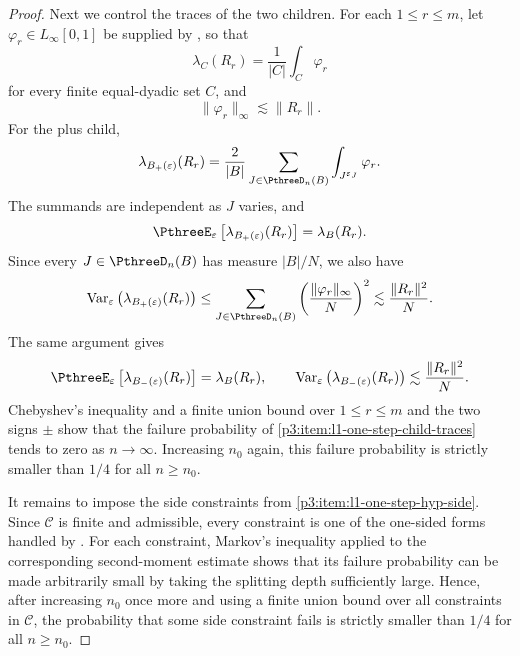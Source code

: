 \documentclass[11pt,reqno]{amsart}
\makeatletter
\theoremstyle{plain}
\theoremstyle{definition}
\newcounter{problempaper}
\newenvironment{problempaperbody}{%
  \setcounter{subsection}{0}%
  \setcounter{subsubsection}{0}%
  \setcounter{paragraph}{0}%
  \renewcommand{\thesubsection}{\arabic{subsection}}%
  \renewcommand{\thesubsubsection}{\thesubsection.\arabic{subsubsection}}%
  \renewcommand{\theparagraph}{\thesubsubsection.\arabic{paragraph}}%
  \let\problem@outersection\section
  \let\problem@outersubsection\subsection
  \let\problem@outersubsubsection\subsubsection
  \let\problem@outerparagraph\paragraph
  \let\section\problem@papersection
  \let\subsection\problem@papersubsection
  \let\subsubsection\problem@papersubsubsection
}{%
  \let\section\problem@outersection
  \let\subsection\problem@outersubsection
  \let\subsubsection\problem@outersubsubsection
  \let\paragraph\problem@outerparagraph
}
\newcommand{\problem@target}[2]{%
  \hypertarget{problem-\theproblempaper-#1-#2}{}%
}
\newcommand{\problem@paperheading}[3]{%
  \par\bigskip
  \problem@target{#1}{#2}%
  \noindent{\large\bfseries #2.\quad #3\par}%
  \nobreak\smallskip
}
\newcommand{\problem@papersubheading}[3]{%
  \par\medskip
  \problem@target{#1}{#2}%
  \noindent{\normalsize\bfseries #2.\quad #3\par}%
  \nobreak\smallskip
}
\newcommand{\problem@papersubsubheading}[3]{%
  \par\smallskip
  \problem@target{#1}{#2}%
  \noindent{\normalsize\itshape #2.\quad #3.\ }%
}
\def\problem@papersection{%
  \@ifstar{\problem@papersectionstar}{\problem@papersectionnostar}%
}
\def\problem@papersectionstar#1{%
  \par\bigskip\noindent{\large\bfseries #1\par}\nobreak\smallskip
}
\def\problem@papersectionnostar#1{%
  \refstepcounter{subsection}%
  \setcounter{subsubsection}{0}%
  \setcounter{paragraph}{0}%
  \problem@paperheading{section}{\thesubsection}{#1}%
  \problem@writecontentsline{section}{\thesubsection}{#1}%
}
\def\problem@papersubsection{%
  \@ifstar{\problem@papersubsectionstar}{\problem@papersubsectionnostar}%
}
\def\problem@papersubsectionstar#1{%
  \par\medskip\noindent{\normalsize\bfseries #1\par}\nobreak\smallskip
}
\def\problem@papersubsectionnostar#1{%
  \refstepcounter{subsubsection}%
  \setcounter{paragraph}{0}%
  \problem@papersubheading{subsection}{\thesubsubsection}{#1}%
  \problem@writecontentsline{subsection}{\thesubsubsection}{#1}%
}
\def\problem@papersubsubsection{%
  \@ifstar{\problem@papersubsubsectionstar}{\problem@papersubsubsectionnostar}%
}
\def\problem@papersubsubsectionstar#1{%
  \par\smallskip\noindent{\normalsize\itshape #1.\ }%
}
\def\problem@papersubsubsectionnostar#1{%
  \refstepcounter{paragraph}%
  \problem@papersubsubheading{subsubsection}{\theparagraph}{#1}%
  \problem@writecontentsline{subsubsection}{\theparagraph}{#1}%
}
\newcommand{\problem@writecontentsline}[3]{%
  \begingroup
  \protected@write\@auxout{}{%
    \string\problemcontentsentry{\theproblempaper}{#1}{#2}{#3}{\thepage}%
  }%
  \endgroup
}
\newcommand{\problemcontentsentry}[5]{%
  \@ifundefined{problemcontents@#1}{%
    \expandafter\gdef\csname problemcontents@#1\endcsname{}%
  }{}%
  \expandafter\g@addto@macro\csname problemcontents@#1\endcsname{%
    \problemcontentsline{#1}{#2}{#3}{#4}{#5}%
  }%
}
\newcommand{\problemcontentslink}[4]{%
  \hyperlink{problem-#1-#2-#3}{#4}%
}
\newcommand{\problemcontentsline}[5]{%
  \ifstrequal{#2}{section}{%
    \par\noindent
    \problemcontentslink{#1}{#2}{#3}{\makebox[2.5em][l]{#3}#4}%
    \nobreak\dotfill
    \problemcontentslink{#1}{#2}{#3}{#5}\par
  }{%
    \ifstrequal{#2}{subsection}{%
      \par\noindent\hspace*{1.5em}%
      \problemcontentslink{#1}{#2}{#3}{\makebox[3.5em][l]{#3}#4}%
      \nobreak\dotfill
      \problemcontentslink{#1}{#2}{#3}{#5}\par
    }{%
      \par\noindent\hspace*{3em}%
      \problemcontentslink{#1}{#2}{#3}{\makebox[4.5em][l]{#3}#4}%
      \nobreak\dotfill
      \problemcontentslink{#1}{#2}{#3}{#5}\par
    }%
  }%
}
\makeatother
\begin{document}
\begin{problempaperbody}
\begin{proof}
Next we control the traces of the two children. For each $1\leq r\leq m$, let $\varphi_r\in L_\infty[0,1]$ be supplied by , so that
\begin{equation*}
        \lambda_C(R_r)=\frac1{|C|}\int_C\varphi_r
\end{equation*}
for every finite equal-dyadic set $C$, and
\begin{equation*}
        \|\varphi_r\|_\infty\lesssim\|R_r\|.
\end{equation*}
For the plus child,
\begin{equation*}
        \lambda_{B_+(\varepsilon)}(R_r)=\frac2{|B|}\sum_{J\in\PthreeD_n(B)}\int_{J^{\varepsilon_J}}\varphi_r.
\end{equation*}
The summands are independent as $J$ varies, and
\begin{equation*}
        \PthreeE_\varepsilon\left[\lambda_{B_+(\varepsilon)}(R_r)\right]=\lambda_B(R_r).
\end{equation*}
Since every $J\in\PthreeD_n(B)$ has measure $|B|/N$, we also have
\begin{equation*}
        \operatorname{Var}_\varepsilon\left(\lambda_{B_+(\varepsilon)}(R_r)\right)\leq\sum_{J\in\PthreeD_n(B)}\left(\frac{\|\varphi_r\|_\infty}{N}\right)^2\lesssim\frac{\|R_r\|^2}{N}.
\end{equation*}
The same argument gives
\begin{equation*}
        \PthreeE_\varepsilon\left[\lambda_{B_-(\varepsilon)}(R_r)\right]=\lambda_B(R_r),\qquad \operatorname{Var}_\varepsilon\left(\lambda_{B_-(\varepsilon)}(R_r)\right)\lesssim\frac{\|R_r\|^2}{N}.
\end{equation*}
Chebyshev's inequality and a finite union bound over $1\leq r\leq m$ and the two signs $\pm$ show that the failure probability of \ref{p3:item:l1-one-step-child-traces} tends to zero as $n\to\infty$. Increasing $n_0$ again, this failure probability is strictly smaller than $1/4$ for all $n\geq n_0$.

It remains to impose the side constraints from \ref{p3:item:l1-one-step-hyp-side}. Since $\mathscr C$ is finite and admissible, every constraint is one of the one-sided forms handled by . For each constraint, Markov's inequality applied to the corresponding second-moment estimate shows that its failure probability can be made arbitrarily small by taking the splitting depth sufficiently large. Hence, after increasing $n_0$ once more and using a finite union bound over all constraints in $\mathscr C$, the probability that some side constraint fails is strictly smaller than $1/4$ for all $n\geq n_0$.


\end{proof}
\end{problempaperbody}
\end{document}
